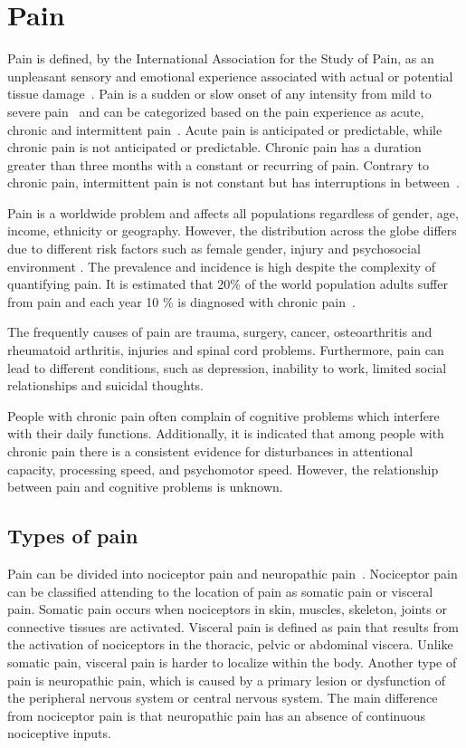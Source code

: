 \section{Pain} \label{sec:Pain}
Pain is defined, by the International Association for the Study of Pain, as an unpleasant sensory and emotional experience associated with actual or potential tissue damage~\cite{Kerstman2013}. 
Pain is a sudden or slow onset of any intensity from mild to severe pain~\cite{Mello2016} and can be categorized based on the pain experience as acute, chronic and intermittent pain~\cite{Goldberg2011}. Acute pain is anticipated or predictable, while  chronic pain is not anticipated or predictable. Chronic pain has a duration greater than three months with a constant or recurring of pain. Contrary to chronic pain, intermittent pain is not constant but has interruptions in between~\cite{Mello2016}.

Pain is a worldwide problem and affects all populations regardless of gender, age, income, ethnicity or geography. However, the distribution across the globe differs due to different risk factors such as female gender, injury and psychosocial environment \cite{Macfarlanea2016}.  The prevalence and incidence is high despite the complexity of quantifying pain. It is estimated that 20\% of the world population adults suffer from pain and each year 10 \% is diagnosed with chronic pain~\cite{Goldberg2011}. 

The frequently causes of pain are trauma, surgery, cancer, osteoarthritis and rheumatoid arthritis, injuries and spinal cord problems. Furthermore, pain can lead to different conditions, such as depression, inability to work, limited social relationships and suicidal thoughts.~\cite{Goldberg2011, Breivik2006}

People with chronic pain often complain of cognitive problems which interfere with their daily functions. Additionally, it is indicated that among people with chronic pain there is a consistent evidence for disturbances in attentional capacity, processing speed, and psychomotor speed. However, the relationship between pain and cognitive problems is unknown.~\cite{Geisser2018}

\subsection{Types of pain}
Pain can be divided into nociceptor pain and neuropathic pain~\cite{Steeds2013}. Nociceptor pain can be classified attending to the location of pain as somatic pain or visceral pain. Somatic pain occurs when nociceptors in skin, muscles, skeleton, joints or connective tissues are activated. Visceral pain is defined as pain that results from the activation of nociceptors in the thoracic, pelvic or abdominal viscera. Unlike somatic pain, visceral pain is harder to localize within the body. Another type of pain is neuropathic pain, which is caused by a primary lesion or dysfunction of the peripheral nervous system or central nervous system. The main difference from nociceptor pain is that neuropathic pain has an absence of continuous nociceptive inputs. \cite{Kerstman2013}

